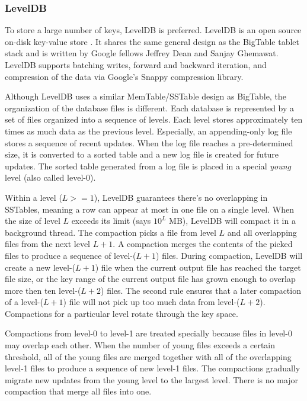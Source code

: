 \documentclass[12pt]{book}
\begin{document}
\subsubsection{LevelDB}
To store a large number of keys, LevelDB is preferred. LevelDB is an open source on-disk key-value store \cite{LevelDB}. It shares the same general design as the BigTable tablet stack and is written by Google fellows Jeffrey Dean and Sanjay Ghemawat. LevelDB supports batching writes, forward and backward iteration, and compression of the data via Google's Snappy compression library.

Although LevelDB uses a similar MemTable/SSTable design as BigTable, the organization of the database files is different. Each database is represented by a set of files organized into a sequence of levels. Each level stores approximately ten times as much data as the previous level. Especially, an appending-only log file stores a sequence of recent updates. When the log file reaches a pre-determined size, it is converted to a sorted table and a new log file is created for future updates. The sorted table generated from a log file is placed in a special {\em young} level (also called level-0).

Within a level ($L > =1$), LevelDB guarantees there's no overlapping in SSTables, meaning a row can appear at most in one file on a single level. When the size of level $L$ exceeds its limit (says $10^L$ MB), LevelDB will compact it in a background thread. The compaction picks a file from level $L$ and all overlapping files from the next level $L+1$. A compaction merges the contents of the picked files to produce a sequence of level-($L+1$) files. During compaction, LevelDB will create a new level-($L+1$) file when the current output file has reached the target file size, or the key range of the current output file has grown enough to overlap more then ten level-($L+2$) files. The second rule ensures that a later compaction of a level-($L+1$) file will not pick up too much data from level-($L+2$). Compactions for a particular level rotate through the key space. 

Compactions from level-0 to level-1 are treated specially because files in level-0 may overlap each other. When the number of young files exceeds a certain threshold, all of the young files are merged together with all of the overlapping level-1 files to produce a sequence of new level-1 files. The compactions gradually migrate new updates from the young level to the largest level. There is no major compaction that merge all files into one.
\end{document}
